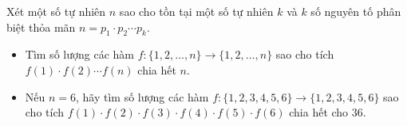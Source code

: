 \ifshowproblem
\begin{problem}\label{example:ROU-2015-MO-10-P2}
    Xét một số tự nhiên \( n \) sao cho tồn tại một số tự nhiên \( k \) và \( k \) số nguyên tố phân biệt thỏa mãn \( n = p_1 \cdot p_2 \cdots p_k \).

    \begin{itemize}[topsep=0pt, partopsep=0pt, itemsep=0pt]
        \item Tìm số lượng các hàm \( f:\{1, 2, \ldots, n\} \longrightarrow \{1, 2, \ldots, n\} \) 
        sao cho tích \( f(1) \cdot f(2) \cdots f(n) \) chia hết \( n \).
        \item Nếu \( n = 6 \), hãy tìm số lượng các hàm \( f:\{1, 2, 3, 4, 5, 6\} \longrightarrow \{1, 2, 3, 4, 5, 6\} \) 
        sao cho tích \( f(1)\cdot f(2)\cdot f(3)\cdot f(4)\cdot f(5)\cdot f(6) \) chia hết cho \( 36 \).
    \end{itemize}    
\end{problem}
\fi

\footnotemark
{}
\fi